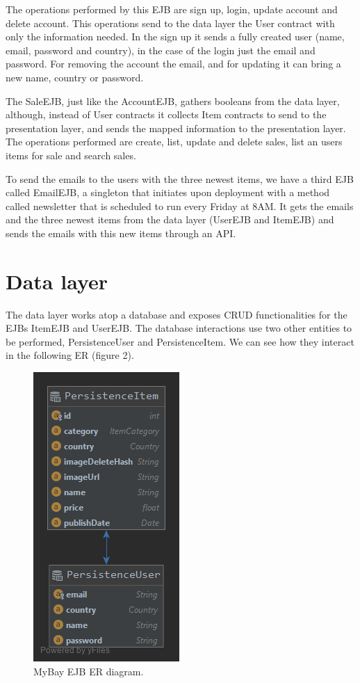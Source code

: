 \documentclass{article}
\begin{document}
\qquad The operations performed by this \ac{EJB} are sign up, login, update account and delete account. This operations send to the data layer the User contract with only the information needed. In the sign up it sends a fully created user (name, email, password and country), in the case of the login just the email and password. For removing the account the email, and for updating it can bring a new name, country or password.

\qquad The SaleEJB, just like the AccountEJB, gathers booleans from the data layer, although, instead of User contracts it collects Item contracts to send to the presentation layer, and sends the mapped information to the presentation layer. The operations performed are create, list, update and delete sales, list an users items for sale and search sales. 

\qquad To send the emails to the users with the three newest items, we have a third \ac{EJB} called EmailEJB, a singleton that initiates upon deployment with a method called newsletter that is scheduled to run every Friday at 8AM. It gets the emails and the three newest items from the data layer (UserEJB and ItemEJB) and sends the emails with this new items through an API. 




\section{Data layer}

\qquad The data layer works atop a database and exposes CRUD functionalities for the \ac{EJB}s ItemEJB and UserEJB. The database interactions use two other entities to be performed, PersistenceUser and PersistenceItem.  We can see how they interact in the following \ac{ER} (figure 2).

\begin{figure}[H]
 \centering
 \includegraphics[scale=0.4]{ER_MyBay.png}
 \caption{MyBay \ac{EJB} \ac{ER} diagram.}
 \label{fig:er}
\end{figure}
\end{document}
